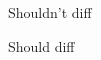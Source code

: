\documentclass{article}
\newcommand{\cmd}[2]{#1 \par #2}
\begin{document}
\cmd{Shouldn't diff}{Should diff}
\end{document}

